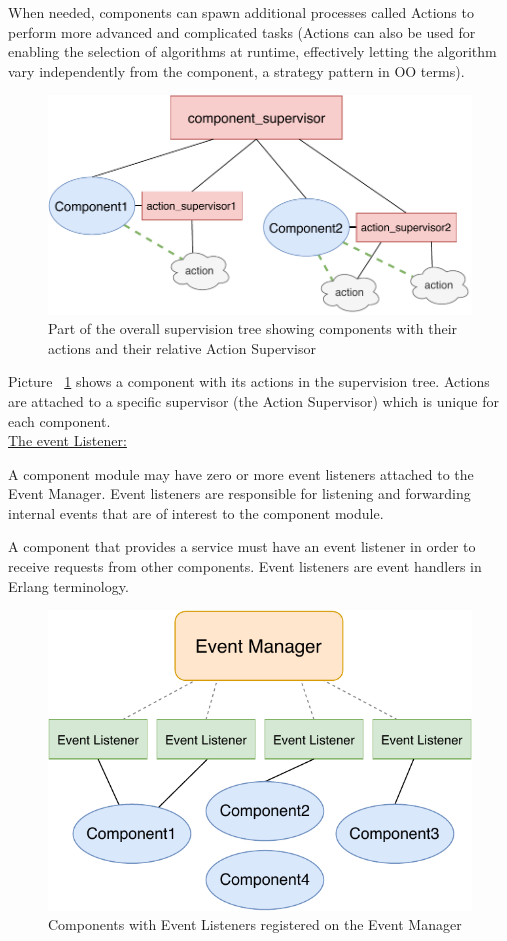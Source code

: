 \documentclass{memoir}
\begin{document}
When needed, components can spawn additional processes called Actions to perform more advanced and complicated tasks (Actions can also be used for enabling the selection of algorithms at runtime, effectively letting the algorithm vary independently from the component, a strategy pattern in OO terms).

\begin{figure}
	\centering
	\includegraphics[width=0.7\linewidth]{implementation_details/component_and_action.pdf}
	\caption{Part of the overall supervision tree showing components with their actions and their relative Action Supervisor}
	\label{fig:component-and-action}
\end{figure}

Picture ~\ref{fig:component-and-action} shows a component with its actions in the supervision tree. Actions are attached to a specific supervisor (the Action Supervisor) which is unique for each component.
\\

\underline{The event Listener:}


A component module may have zero or more event listeners attached to the Event Manager. Event listeners are responsible for listening and forwarding internal events that are of interest to the component module.

A component that provides a service must have an event listener in order to receive requests from other components. Event listeners are event handlers in Erlang terminology.

\begin{figure}
	\centering
	\includegraphics[width=0.7\linewidth]{implementation_details/components_event_listeners.pdf}
	\caption{Components with Event Listeners registered on the Event Manager}
	\label{fig:component-event-listeners}
\end{figure}
\end{document}
